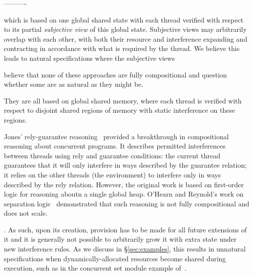 ----------


which is based on one global shared state with
each thread verified with respect to its partial {\em subjective view}
of this global state. Subjective views may arbitrarily overlap with
each other, with both their resource and interference expanding and
contracting  in accordance with what is required by the thread.
We believe this leads to natural  specifications where the subjective
views 




believe that
none of these approaches are fully compositional and question whether
some are as natural as they might be. 






They are all based on global
shared memory, where each thread is verified with respect to
disjoint shared regions of memory  with static
interference on these regions.


Jones' rely-guarantee reasoning~\cite{rg} provided a
breakthrough in compositional reasoning about concurrent programs. It
describes permitted interferences between threads using rely and
guarantee conditions: the current thread guarantees that it will only
interfere in ways described by the guarantee relation; it relies on
the other threads (the environment) to interfere only  in ways
described by the rely relation. However, the original work is based on
first-order logic for reasoning aboutn
a single global heap. O'Hearn and Reynold's
work on separation logic~\cite{2001popland john's survey} demonstrated that such reasoning is not
fully compositional and does not scale. 


. As such, upon its creation, provision
has to be made for all future extensions of it and it is generally not
possible to arbitrarily grow it with extra state under new
interference rules.  As we discuss in \S\ref{sec:examples}, this
results in unnatural specifications when dynamically-allocated
resources become shared during execution, such as in the concurrent
set module example of~\cite{cap-ecoop10}.





